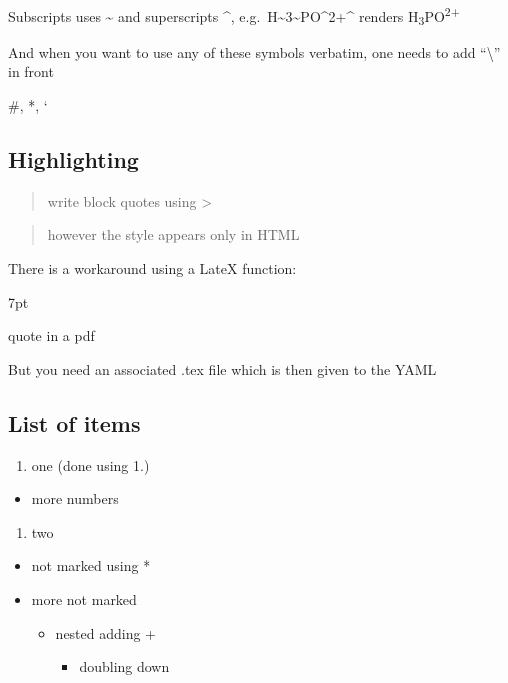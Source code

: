\documentclass[
  11pt,
]{article}
\providecommand{\tightlist}{%
  \setlength{\itemsep}{0pt}\setlength{\parskip}{0pt}}
\newenvironment{formal}{%
  \def\FrameCommand{%
    \hspace{1pt}%
    {\color{gray}\vrule width 2pt}%
    {\color{white}\vrule width 4pt}%
    \colorbox{white}%
  }%
  \MakeFramed{\advance\hsize-\width\FrameRestore}%
  \noindent\hspace{-4.55pt}%
  \begin{adjustwidth}{}{7pt}%
  \vspace{2pt}\vspace{2pt}%
}
{%
  \vspace{2pt}\end{adjustwidth}\endMakeFramed%
}
\begin{document}
Subscripts uses \textasciitilde{} and superscripts \^{}, e.g.~H\textasciitilde3\textasciitilde PO\^{}2+\^{} renders H\textsubscript{3}PO\textsuperscript{2+}

And when you want to use any of these symbols verbatim, one needs to add ``\textbackslash{}'' in front

\#, *, `

\hypertarget{highlighting}{%
\subsection{Highlighting}\label{highlighting}}

\begin{quote}
write block quotes using \textgreater{}
\end{quote}

\begin{quote}
however the style appears only in HTML
\end{quote}

There is a workaround using a LateX function:

\begin{formal}
  quote in a pdf
\end{formal}

But you need an associated .tex file which is then given to the YAML

\hypertarget{list-of-items}{%
\subsection{List of items}\label{list-of-items}}

\begin{enumerate}
\def\labelenumi{\arabic{enumi}.}
\tightlist
\item
  one (done using 1.)
\end{enumerate}

\begin{itemize}
\tightlist
\item
  more numbers
\end{itemize}

\begin{enumerate}
\def\labelenumi{\arabic{enumi}.}
\setcounter{enumi}{1}
\tightlist
\item
  two
\end{enumerate}

\begin{itemize}
\item
  not marked using *
\item
  more not marked

  \begin{itemize}
  \item
    nested adding +

    \begin{itemize}
    \tightlist
    \item
      doubling down
    \end{itemize}
  \end{itemize}
\end{itemize}
\end{document}
